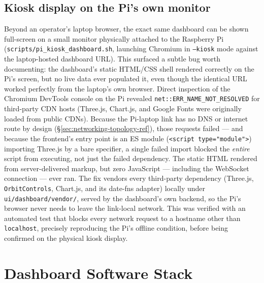 \documentclass[11pt]{article}
\begin{document}
\subsection{Kiosk display on the Pi's own monitor}

Beyond an operator's laptop browser, the exact same dashboard can be shown full-screen on a small monitor physically attached to the Raspberry Pi (\texttt{scripts/pi\_kiosk\_dashboard.sh}, launching Chromium in \texttt{--kiosk} mode against the laptop-hosted dashboard URL). This surfaced a subtle bug worth documenting: the dashboard's static HTML/CSS shell rendered correctly on the Pi's screen, but no live data ever populated it, even though the identical URL worked perfectly from the laptop's own browser. Direct inspection of the Chromium DevTools console on the Pi revealed \texttt{net::ERR\_NAME\_NOT\_RESOLVED} for third-party CDN hosts (Three.js, Chart.js, and Google Fonts were originally loaded from public CDNs). Because the Pi-laptop link has no DNS or internet route by design (\S\ref{sec:networking-topology-ref}), those requests failed --- and because the frontend's entry point is an ES module (\texttt{<script type="module">}) importing Three.js by a bare specifier, a single failed import blocked the \emph{entire} script from executing, not just the failed dependency. The static HTML rendered from server-delivered markup, but zero JavaScript --- including the WebSocket connection --- ever ran. The fix vendors every third-party dependency (Three.js, \texttt{OrbitControls}, Chart.js, and its date-fns adapter) locally under \texttt{ui/dashboard/vendor/}, served by the dashboard's own backend, so the Pi's browser never needs to leave the link-local network. This was verified with an automated test that blocks every network request to a hostname other than \texttt{localhost}, precisely reproducing the Pi's offline condition, before being confirmed on the physical kiosk display.

\section{Dashboard Software Stack}
\end{document}
